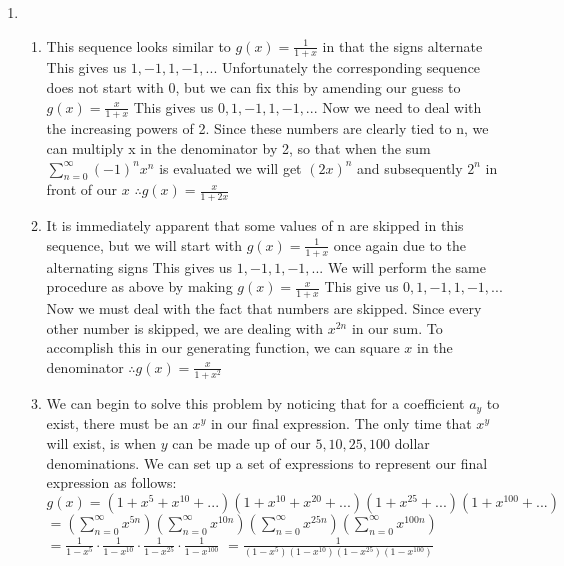 \documentclass{article}
\begin{document}
\begin{enumerate}
		\item
		\begin{enumerate}
			\item This sequence looks similar to $g(x)=\frac{1}{1+x}$ in that the signs alternate
			\newline This gives us $1,-1,1,-1,...$
			\newline Unfortunately the corresponding sequence does not start with 0, but we can fix this by amending our guess to $g(x)=\frac{x}{1+x}$
			\newline This gives us $0,1,-1,1,-1,...$
			\newline Now we need to deal with the increasing powers of 2. Since these numbers are clearly tied to n, we can multiply x in the denominator by 2, so that when the sum $\sum\limits_{n=0}^{\infty}(-1)^nx^n$ is evaluated we will get $(2x)^n$ and subsequently $2^n$ in front of our $x$
			\newline $\therefore g(x)=\frac{x}{1+2x}$ 
			
			\newpage
			\item It is immediately apparent that some values of n are skipped in this sequence, but we will start with $g(x)=\frac{1}{1+x}$ once again due to the alternating signs
			\newline This gives us $1,-1,1,-1,...$
			\newline We will perform the same procedure as above by making $g(x)=\frac{x}{1+x}$
			\newline This give us $0,1,-1,1,-1,...$
			\newline Now we must deal with the fact that numbers are skipped. Since every other number is skipped, we are dealing with $x^{2n}$ in our sum. To accomplish this in our generating function, we can square $x$ in the denominator
			\newline $\therefore g(x)=\frac{x}{1+x^2}$
			
			\item We can begin to solve this problem by noticing that for a coefficient $a_y$ to exist, there must be an $x^y$ in our final expression. The only time that $x^y$ will exist, is when $y$ can be made up of our $5,10,25,100$ dollar denominations.
			\newline We can set up a set of expressions to represent our final expression as follows:
			\newline $g(x)=(1+x^5+x^{10}+...)(1+x^{10}+x^{20}+...)(1+x^{25}+...)(1+x^{100}+...)$
			\newline $=(\sum\limits_{n=0}^{\infty}x^{5n})(\sum\limits_{n=0}^{\infty}x^{10n})(\sum\limits_{n=0}^{\infty}x^{25n})(\sum\limits_{n=0}^{\infty}x^{100n})$
			\newline $=\frac{1}{1-x^5}\cdot\frac{1}{1-x^{10}}\cdot\frac{1}{1-x^{25}}\cdot\frac{1}{1-x^{100}}$
			\newline $=\frac{1}{(1-x^5)(1-x^{10})(1-x^{25})(1-x^{100})}$
		\end{enumerate}
		
	\end{enumerate}
\end{document}
